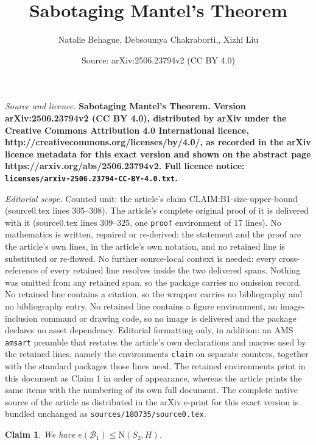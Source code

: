 \documentclass[10pt,a4paper]{amsart}
\title{\bf\Large Sabotaging Mantel's Theorem}
\author{Natalie Behague, Debsoumya Chakraborti,, Xizhi Liu}
\date{Source: arXiv:2506.23794v2 (CC BY 4.0)}
\newtheorem{claim}{Claim}
\newcommand{\graph}{H}
\begin{document}
\maketitle

\noindent\emph{Source and licence.} \bf\Large Sabotaging Mantel's Theorem. Version arXiv:2506.23794v2 (CC BY 4.0), distributed by arXiv under the Creative Commons Attribution 4.0 International licence, http://creativecommons.org/licenses/by/4.0/, as recorded in the arXiv licence metadata for this exact version and shown on the abstract page https://arxiv.org/abs/2506.23794v2. Full licence notice: \texttt{licenses/arxiv-2506.23794-CC-BY-4.0.txt}.\par\smallskip

\noindent\textit{Editorial scope.} Counted unit: the article's claim CLAIM:B1-size-upper-bound (source0.tex lines 305--308). The article's complete original proof of it is delivered with it (source0.tex lines 309--325, one \texttt{proof} environment of 17 lines). No mathematics is written, repaired or re-derived: the statement and the proof are the article's own lines, in the article's own notation, and no retained line is substituted or re-flowed.  No further source-local context is needed: every cross-reference of every retained line resolves inside the two delivered spans.  Nothing was omitted from any retained span, so the package carries no omission record.  No retained line contains a citation, so the wrapper carries no bibliography and no bibliography entry.  No retained line contains a figure environment, an image-inclusion command or drawing code, so no image is delivered and the package declares no asset dependency.  Editorial formatting only, in addition: an AMS \texttt{amsart} preamble that restates the article's own declarations and macros used by the retained lines, namely the environments \texttt{claim} on separate counters, together with the standard packages those lines need.  The retained environments print in this document as Claim 1 in order of appearance, whereas the article prints the same items with the numbering of its own full document.  The complete native source of the article as distributed in the arXiv e-print for this exact version is bundled unchanged as \texttt{sources/180735/source0.tex}.
    \begin{claim}\label{CLAIM:B1-size-upper-bound}
        We have $e(\mathcal{B}_{1}) \le \mathrm{N}(S_{2}, \graph)$.
    \end{claim}
\end{document}
